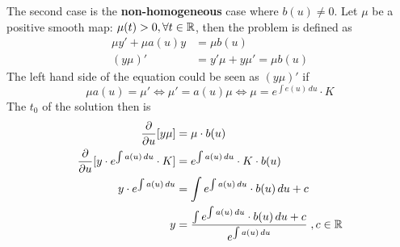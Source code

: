 The second case is the \textbf{non-homogeneous} case where $b(u)\neq0$.
Let $\mu$ be a positive smooth map: $\mu(t)>0, \forall t\in\mathbb{R}$, then the problem is defined as
\begin{align*}
    \mu y' + \mu a(u) y & = \mu b(u)\\
    (y\mu)' & = y'\mu + y\mu' = \mu b(u)
\end{align*}
The left hand side of the equation could be seen as $(y\mu)'$ if
\begin{equation*}
    \mu a(u) = \mu' \Leftrightarrow \mu' = a(u)\mu \Leftrightarrow \mu = e^{\int e(u)\, du}\cdot K
\end{equation*}
The $t_0$ of the solution then is
\begin{align*}
    \frac{\partial}{\partial u}[y\mu] & = \mu\cdot b(u)\\
    \frac{\partial}{\partial u}[y\cdot e^{\int a(u)\, du}\cdot K] & = e^{\int a(u)\,du}\cdot K \cdot b(u)\\
    y\cdot e^{\int a(u)\, du} & = \int e^{\int a(u)\, du}\cdot b(u)\, du + c\\
    y & = \frac{\int e^{\int a(u)\, du}\cdot b(u)\, du + c}{e^{\int a(u)\, du}}\; ,c\in\mathbb{R}
\end{align*}


